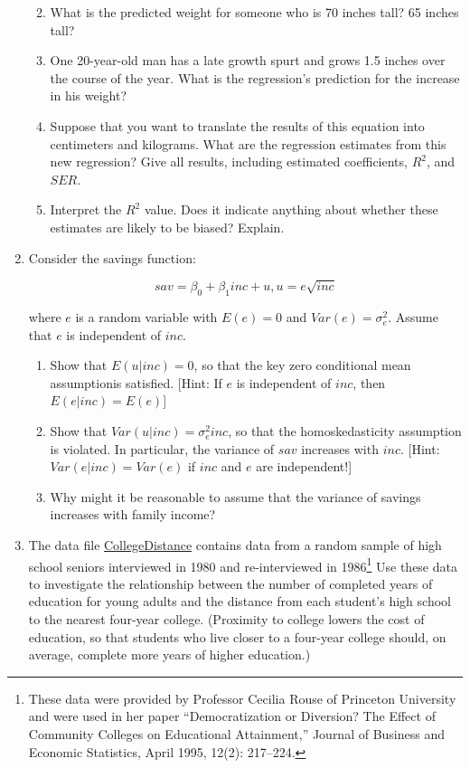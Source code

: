 \documentclass[
]{article}
\begin{document}
\begin{enumerate}
  \begin{enumerate}
  \def\labelenumii{\alph{enumii}.}
  \item
    What is the predicted weight for someone who is 70 inches tall? 65
    inches tall?
  \item
    One 20-year-old man has a late growth spurt and grows 1.5 inches
    over the course of the year. What is the regression's prediction for
    the increase in his weight?
  \item
    Suppose that you want to translate the results of this equation into
    centimeters and kilograms. What are the regression estimates from
    this new regression? Give all results, including estimated
    coefficients, \(R^2\), and \(SER\).
  \item
    Interpret the \(R^2\) value. Does it indicate anything about whether
    these estimates are likely to be biased? Explain.
  \end{enumerate}
  \clearpage
\item
  Consider the savings function:


\[sav =  \beta_0 + \beta_1 inc + u, u = e\sqrt{inc}\]

where \(e\) is a random variable with \(E(e) = 0\) and
\(Var(e) = \sigma^2_e\). Assume that \(e\) is independent of \(inc\).

\begin{enumerate}
\def\labelenumi{\alph{enumi}.}

\item
  Show that \(E(u|inc)=0\), so that the key zero conditional mean
  assumptionis satisfied. {[}Hint: If \(e\) is independent of \(inc\),
  then \(E(e|inc) = E(e)\){]}
\item
  Show that \(Var(u|inc) = \sigma^2_einc\), so that the homoskedasticity
  assumption is violated. In particular, the variance of \(sav\)
  increases with \(inc\). {[}Hint: \(Var(e|inc) = Var(e)\) if \(inc\)
  and \(e\) are independent!{]}
\item
  Why might it be reasonable to assume that the variance of savings
  increases with family income?
\end{enumerate}


\item
  The data file \href{../collegedistance.dta}{CollegeDistance} contains
  data from a random sample of high school seniors interviewed in 1980
  and re-interviewed in 1986\footnote{These data were provided by
    Professor Cecilia Rouse of Princeton University and were used in her
    paper ``Democratization or Diversion? The Effect of Community
    Colleges on Educational Attainment,'' Journal of Business and
    Economic Statistics, April 1995, 12(2): 217--224.} Use these data to
  investigate the relationship between the number of completed years of
  education for young adults and the distance from each student's high
  school to the nearest four-year college. (Proximity to college lowers
  the cost of education, so that students who live closer to a four-year
  college should, on average, complete more years of higher education.)



\end{enumerate}
\end{document}
